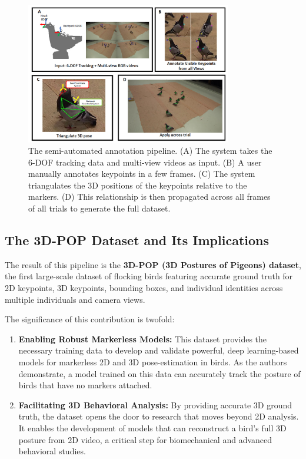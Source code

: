 \begin{figure}[H]
    \centering
    \includegraphics[width=0.8\textwidth]{archivos/figuras/setup2.jpg} 
    \caption{The semi-automated annotation pipeline. (A) The system takes the 6-DOF tracking data and multi-view videos as input. (B) A user manually annotates keypoints in a few frames. (C) The system triangulates the 3D positions of the keypoints relative to the markers. (D) This relationship is then propagated across all frames of all trials to generate the full dataset.}
    \label{fig:pipeline}
\end{figure}

\subsection{The 3D-POP Dataset and Its Implications}

The result of this pipeline is the \textbf{3D-POP (3D Postures of Pigeons) dataset}, the first large-scale dataset of flocking birds featuring accurate ground truth for 2D keypoints, 3D keypoints, bounding boxes, and individual identities across multiple individuals and camera views.

The significance of this contribution is twofold:
\begin{enumerate}
    \item \textbf{Enabling Robust Markerless Models:} This dataset provides the necessary training data to develop and validate powerful, deep learning-based models for markerless 2D and 3D pose-estimation in birds. As the authors demonstrate, a model trained on this data can accurately track the posture of birds that have no markers attached.
    \item \textbf{Facilitating 3D Behavioral Analysis:} By providing accurate 3D ground truth, the dataset opens the door to research that moves beyond 2D analysis. It enables the development of models that can reconstruct a bird's full 3D posture from 2D video, a critical step for biomechanical and advanced behavioral studies.
\end{enumerate}

